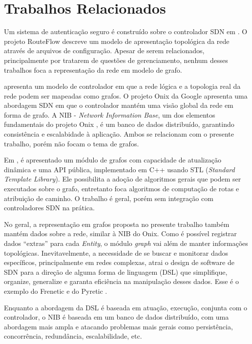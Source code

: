 \section{Trabalhos Relacionados}
\label{sec:related-work}

Um sistema de autenticação 
seguro é construído sobre o controlador SDN em \citep{james2013HyperPass}.
O projeto RouteFlow  \citep{christian2010openflow} 
descreve um modelo de apresentação topológica da rede 
através de arquivos de configuração.
Apesar de serem relacionados, 
principalmente por tratarem de questões de gerenciamento,
nenhum desses trabalhos foca a representação da rede em modelo de grafo.

\citep{martin2010virtualizing} apresenta um modelo
de controlador em que a rede lógica e a topologia real da rede podem 
ser mapeadas como grafos.
O projeto Onix da Google \citep{teemu2010onix} 
apresenta uma abordagem SDN em que o 
controlador mantém uma visão global da rede em forma de grafo.
A NIB - \emph{Network Information Base}, um dos elementos fundamentais 
do projeto Onix \citep{teemu2010onix},
é um banco de dados distribuído, 
garantindo consistência e escalabidade à aplicação.
Ambos se relacionam com o presente trabalho,
porém não focam o tema de grafos.

Em \citep{ramya2012dynamic}, é apresentado um módulo de 
grafos com capacidade de atualização dinâmica e uma API pública,
implementado em C++ usando STL (\emph{Standard Template Library}).
Ele possibilita a adoção de algoritmos gerais que podem ser executados 
sobre o grafo, entretanto foca algoritmos de computação de rotas e atribuição de caminho.
O trabalho é geral, porém sem integração com controladores SDN na prática.

No geral, a representação em grafos proposta no presente trabalho 
também mantém dados sobre a rede, similar à NIB do Onix.
Como é possível registrar dados ``extras'' para cada \emph{Entity}, 
o módulo \emph{graph} vai além de manter informações topológicas.
Inevitavelmente, a necessidade de se buscar e monitorar dados 
específicos, principalmente em redes complexas, atrai o design de software 
de SDN para a direção de alguma forma de linguagem (DSL) que simplifique, 
organize, generalize e garanta eficiência na manipulação desses dados.
Esse é o exemplo do Frenetic \citep{Foster:2011:FNP:2034574.2034812} 
e do Pyretic \citep{Monsanto:2013:CSN:2482626.2482629}.

Enquanto a abordagem da DSL é baseada em atuação, execução,
conjunta com o controlador,
o NIB é baseada em um banco de dados distribuído,
com uma abordagem mais ampla e atacando problemas mais gerais
como persistência, concorrência, redundância, escalabilidade, etc.

